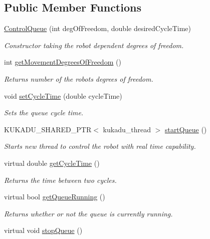 \subsection*{Public Member Functions}
\begin{DoxyCompactItemize}
\item 
\hyperlink{classkukadu_1_1ControlQueue_a946b967c77d0b6d663239fa60ff602f9}{Control\-Queue} (int deg\-Of\-Freedom, double desired\-Cycle\-Time)
\begin{DoxyCompactList}\small\item\em Constructor taking the robot dependent degrees of freedom. \end{DoxyCompactList}\item 
int \hyperlink{classkukadu_1_1ControlQueue_aaa583d0b0c04c7f0acc869cca0e8ef41}{get\-Movement\-Degrees\-Of\-Freedom} ()
\begin{DoxyCompactList}\small\item\em Returns number of the robots degrees of freedom. \end{DoxyCompactList}\item 
void \hyperlink{classkukadu_1_1ControlQueue_a5245ff31c7dea26070743d1f6560801c}{set\-Cycle\-Time} (double cycle\-Time)
\begin{DoxyCompactList}\small\item\em Sets the queue cycle time. \end{DoxyCompactList}\item 
\hypertarget{classkukadu_1_1ControlQueue_a35d6a6e4e7c8467691c11567fe21f340}{K\-U\-K\-A\-D\-U\-\_\-\-S\-H\-A\-R\-E\-D\-\_\-\-P\-T\-R$<$ kukadu\-\_\-thread $>$ \hyperlink{classkukadu_1_1ControlQueue_a35d6a6e4e7c8467691c11567fe21f340}{start\-Queue} ()}\label{classkukadu_1_1ControlQueue_a35d6a6e4e7c8467691c11567fe21f340}

\begin{DoxyCompactList}\small\item\em Starts new thread to control the robot with real time capability. \end{DoxyCompactList}\item 
virtual double \hyperlink{classkukadu_1_1ControlQueue_a82349f67c4ea6f2dc2689e765717d8e2}{get\-Cycle\-Time} ()
\begin{DoxyCompactList}\small\item\em Returns the time between two cycles. \end{DoxyCompactList}\item 
virtual bool \hyperlink{classkukadu_1_1ControlQueue_aa02fcb2c8cd2c1c8ca553ae636000beb}{get\-Queue\-Running} ()
\begin{DoxyCompactList}\small\item\em Returns whether or not the queue is currently running. \end{DoxyCompactList}\item 
\hypertarget{classkukadu_1_1ControlQueue_a8d413404960c7597032876396777e38f}{virtual void \hyperlink{classkukadu_1_1ControlQueue_a8d413404960c7597032876396777e38f}{stop\-Queue} ()}\label{classkukadu_1_1ControlQueue_a8d413404960c7597032876396777e38f}


\end{DoxyCompactItemize}
